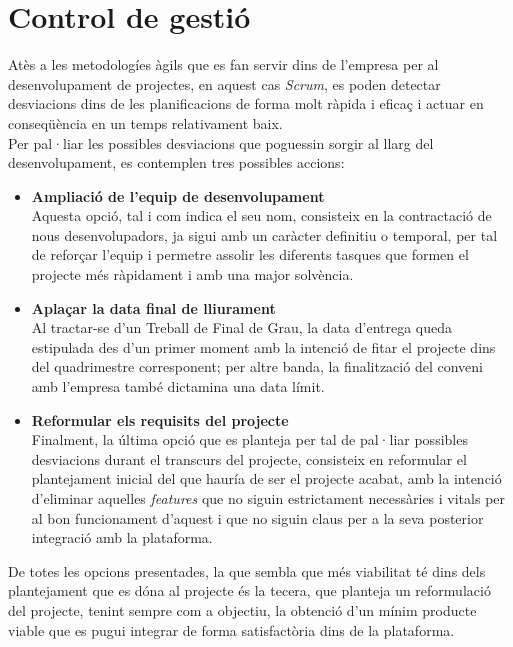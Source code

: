\section{Control de gestió}
Atès a les metodologíes àgils que es fan servir dins de l'empresa per al desenvolupament de projectes, en aquest cas \textit{Scrum}, es poden detectar desviacions dins de les planificacions de forma molt ràpida i eficaç i actuar en conseqüència en un temps relativament baix.\\
\newline Per pal·liar les possibles desviacions que poguessin sorgir al llarg del desenvolupament, es contemplen tres possibles accions:
\begin{itemize}
	\item \textbf{Ampliació de l'equip de desenvolupament}\\
	\newline Aquesta opció, tal i com indica el seu nom, consisteix en la contractació de nous desenvolupadors, ja sigui amb un caràcter definitiu o temporal, per tal de reforçar l'equip i permetre assolir les diferents tasques que formen el projecte més ràpidament i amb una major solvència.\\

	\item \textbf{Aplaçar la data final de lliurament}\\
	\newline Al tractar-se d'un Treball de Final de Grau, la data d'entrega queda estipulada des d'un primer moment amb la intenció de fitar el projecte dins del quadrimestre corresponent; per altre banda, la finalització del conveni amb l'empresa també dictamina una data límit.\\
	
	\item \textbf{Reformular els requisits del projecte}\\
	\newline Finalment, la última opció que es planteja per tal de pal·liar possibles desviacions durant el transcurs del projecte, consisteix en reformular el plantejament inicial del que hauría de ser el projecte acabat, amb la intenció d'eliminar aquelles \textit{features} que no siguin estrictament necessàries i vitals per al bon funcionament d'aquest i que no siguin claus per a la seva posterior integració amb la plataforma.\\
\end{itemize}

De totes les opcions presentades, la que sembla que més viabilitat té dins dels plantejament que es dóna al projecte és la tecera, que planteja un reformulació del projecte, tenint sempre com a objectiu, la obtenció d'un mínim producte viable que es pugui integrar de forma satisfactòria dins de la plataforma.